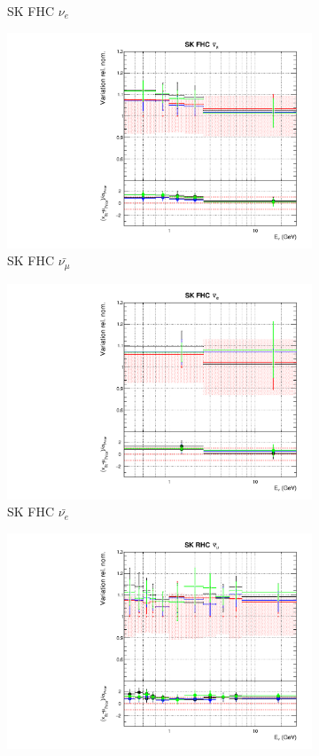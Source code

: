 \begin{figure}[t]
\begin{subfigure}{0.24\textwidth}
  \caption{SK FHC $\nu_e$}
  \label{fig:}
\end{subfigure}
\begin{subfigure}{0.24\textwidth}
  \centering
  \includegraphics[width=0.95\linewidth]{figs/detcovbinflux_10}
  \caption{SK FHC $\bar{\nu_{\mu}}$}
  \label{fig:}
\end{subfigure}
\begin{subfigure}{0.24\textwidth}
  \centering
  \includegraphics[width=0.95\linewidth]{figs/detcovbinflux_11}
  \caption{SK FHC $\bar{\nu_{e}}$}
  \label{fig:}
\end{subfigure}
\begin{subfigure}{0.24\textwidth}
  \centering
  \includegraphics[width=0.95\linewidth]{figs/detcovbinflux_12}

\end{subfigure}
\end{figure}
